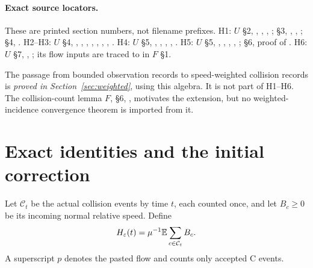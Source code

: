 \documentclass[11pt,letterpaper]{article}
\numberwithin{equation}{section}
\theoremstyle{definition}\newtheorem{assumption}[theorem]{Assumption}
\theoremstyle{remark}\newtheorem{remark}[theorem]{Remark}
\newcommand{\eps}{\varepsilon}\newcommand{\dd}{\,\mathrm d}
\begin{document}
\paragraph{Exact source locators.}
{\small\raggedright
These are printed section numbers, not filename prefixes. H1: $U$ \S2, , , , ; \S3, , , ; \S4, . H2--H3: $U$ \S4, , , , , , , , . H4: $U$ \S5, , , , , . H5: $U$ \S5, , , , , ; \S6, proof of . H6: $U$ \S7, , ; its flow inputs are traced to \cite[Proposition 1.2 and Appendix A, proof of Proposition 4.5]{DHM} in $F$ \S1.\par}

The passage from bounded observation records to speed-weighted collision records is \emph{proved in Section~\ref{sec:weighted}}, using this algebra. It is not part of H1--H6. The collision-count lemma $F$, \S6, , motivates the extension, but no weighted-incidence convergence theorem is imported from it.

\section{Exact identities and the initial correction}\label{sec:exact}
Let $\mathcal C_t$ be the actual collision events by time $t$, each counted once, and let $B_c\ge0$ be its incoming normal relative speed. Define
\begin{equation}\label{eq:H}
 H_\eps(t)=\mu^{-1}\E\sum_{c\in\mathcal C_t}B_c.
\end{equation}
A superscript $p$ denotes the pasted flow and counts only accepted C events.
\end{document}
